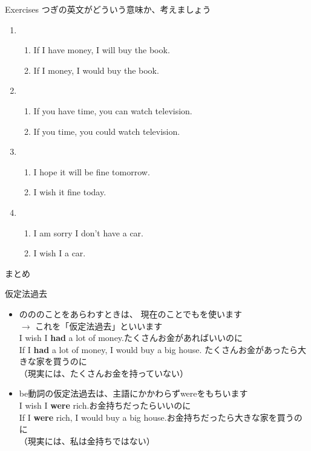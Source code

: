 \documentclass[aspectratio=169,xcolor={dvipsnames,table}]{beamer}
\begin{document}
\begin{frame}[plain]{Exercises}
 つぎの英文がどういう意味か、考えましょう


\begin{enumerate}
 \item \begin{enumerate}
	\item If I have money, I will buy the book. 
	\item If I  money, I would buy the book.
       \end{enumerate}
 \item \begin{enumerate}
	\item If you have time, you can watch television.
	\item If you  time, you could watch television.
       \end{enumerate}
 \item \begin{enumerate}
	\item I hope it will be fine tomorrow.
	\item I wish it  fine today.
       \end{enumerate}
 \item \begin{enumerate}
	\item I am sorry I don't have a car.
	\item I wish I  a car.
       \end{enumerate}
\end{enumerate}
\end{frame}
\begin{frame}[plain]{まとめ}
 \begin{block}{仮定法過去}
\small

\begin{itemize}
 \item {}のののことをあらわすときは、
現在のことでもを使います\\
\hfill{}$\longrightarrow$ これを「仮定法過去」といいます\\
\hfill{}I wish I {\bfseries had} a lot of money.{\scriptsize たくさんお金があればいいのに}\\
\hfill{}If I {\bfseries had} a lot of money, I would buy a big house.
\hfill{\scriptsize たくさんお金があったら大きな家を買うのに}\\
\hfill{\scriptsize （現実には、たくさんお金を持っていない）}
 \item be動詞の仮定法過去は、主語にかかわらずwereをもちいます\\
\hfill{}I wish I {\bfseries were} rich.{\scriptsize お金持ちだったらいいのに}\\
\hfill{}If I {\bfseries were} rich, I would buy a big house.{\scriptsize お金持ちだったら大きな家を買うのに}\\
\hfill{\scriptsize （現実には、私は金持ちではない）}
\end{itemize}
\end{block}
\end{frame}
\end{document}
